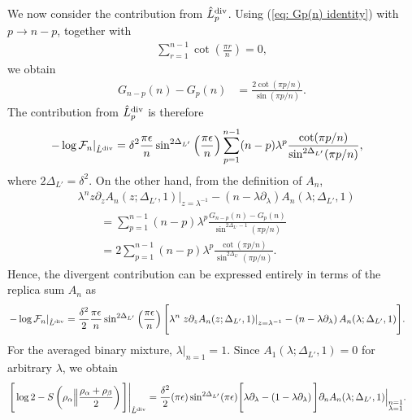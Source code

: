 \documentclass[11pt]{article}
\newcommand{\ep}{\epsilon}
\newcommand{\p}{\partial}
\newcommand{\nn}{\nonumber}
\newcommand{\lb}{\left(}
\newcommand{\rb}{\right)}
\begin{document}
We now consider the contribution from $\hat L_p^{\rm div}$. Using (\ref{eq: Gp(n) identity}) with
$p\rightarrow n-p$, together with
\begin{align}
    \sum_{r=1}^{n-1}\cot\lb\frac{\pi r}{n}\rb=0,
\end{align}
we obtain
\begin{align}
    G_{n-p}(n)-G_p(n)
    &=
    \frac{2\cot(\pi p/n)}
    {\sin(\pi p/n)}.
\end{align}
The contribution from $\hat L_p^{\rm div}$ is therefore
\begin{align}
    \left.-\log\mathcal{F}_n\right|_{\hat L^{\rm div}}
    &=
    \delta^2\frac{\pi\ep}{n}
    \sin^{2\Delta_{L'}}\lb\frac{\pi\ep}{n}\rb
    \sum_{p=1}^{n-1}
    (n-p)\lambda^p
    \frac{\cot(\pi p/n)}
    {\sin^{2\Delta_{L'}}(\pi p/n)},
\end{align}
where $2\Delta_{L'}=\delta^2$. On the other hand, from the definition of $A_n$,
\begin{align}
    &\lambda^n
    \left.
    z\p_zA_n(z;\Delta_{L'},1)
    \right|_{z=\lambda^{-1}}
    -
    \lb n-\lambda\p_\lambda\rb
    A_n(\lambda;\Delta_{L'},1)
    \nn\\
    &\qquad=
    \sum_{p=1}^{n-1}
    (n-p)\lambda^p
    \frac{G_{n-p}(n)-G_p(n)}
    {\sin^{2\Delta_{L'}-1}(\pi p/n)}
    \nn\\
    &\qquad=
    2\sum_{p=1}^{n-1}
    (n-p)\lambda^p
    \frac{\cot(\pi p/n)}
    {\sin^{2\Delta_{L'}}(\pi p/n)}.
\end{align}
Hence, the divergent contribution can be expressed entirely in terms of the replica sum
$A_n$ as
\begin{align}
    \left.-\log\mathcal{F}_n\right|_{\hat L^{\rm div}}
    &=
    \frac{\delta^2}{2}
    \frac{\pi\ep}{n}
    \sin^{2\Delta_{L'}}\lb\frac{\pi\ep}{n}\rb
    \Bigg[
    \lambda^n
    \left.
    z\p_zA_n(z;\Delta_{L'},1)
    \right|_{z=\lambda^{-1}}
    -
    \lb n-\lambda\p_\lambda\rb
    A_n(\lambda;\Delta_{L'},1)
    \Bigg].
\end{align}
For the averaged binary mixture, $\lambda|_{n=1}=1$. Since
$A_1(\lambda;\Delta_{L'},1)=0$ for arbitrary $\lambda$, we obtain
\begin{align}
    \left.
    \Bigg[
    \log2-
    S\lb
    \rho_\alpha
    \Big\|
    \frac{\rho_\alpha+\rho_\beta}{2}
    \rb
    \Bigg]
    \right|_{\hat L^{\rm div}}
    &=
    \frac{\delta^2}{2}
    (\pi\ep)
    \sin^{2\Delta_{L'}}(\pi\ep)
    \Bigg[
    \lambda\p_\lambda
    -
    \lb1-\lambda\p_\lambda\rb
    \Bigg]
    \p_nA_n(\lambda;\Delta_{L'},1)
    \Big|_{\substack{n=1\\\lambda=1}} .
\end{align}
\end{document}
